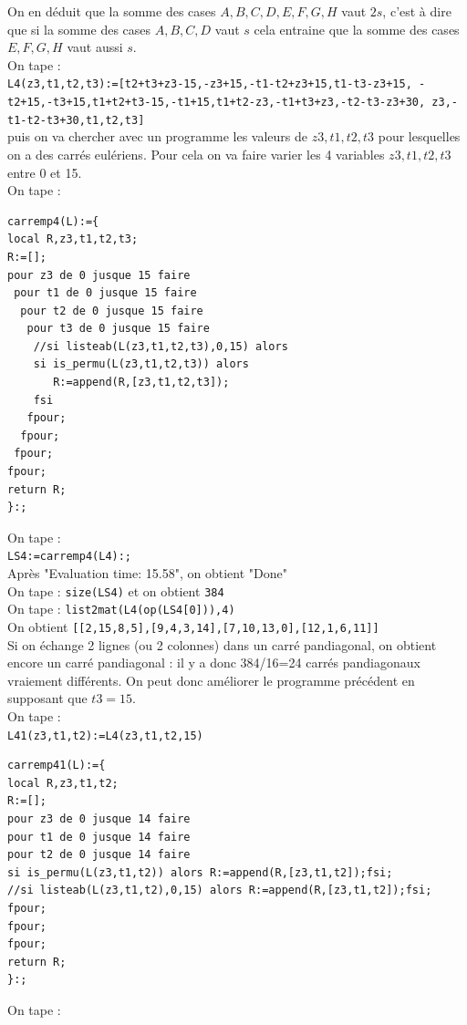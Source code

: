 \documentclass[a4paper,11pt]{book}
\begin{document}
On en d\'eduit que la somme des cases $A,B,C,D,E,F,G,H$ vaut $2s$,
c'est \`a dire que si la somme des cases $A,B,C,D$ vaut $s$ cela entraine que
la somme des cases $E,F,G,H$ vaut aussi $s$.\\
On tape :\\
{\tt L4(z3,t1,t2,t3):=[t2+t3+z3-15,-z3+15,-t1-t2+z3+15,t1-t3-z3+15,
-t2+15,-t3+15,t1+t2+t3-15,-t1+15,t1+t2-z3,-t1+t3+z3,-t2-t3-z3+30,
z3,-t1-t2-t3+30,t1,t2,t3]}\\
puis on va chercher avec un programme les valeurs de $z3,t1,t2,t3$ pour 
lesquelles on a des carr\'es eul\'eriens. Pour cela on va faire varier les 4 
variables $z3,t1,t2,t3$ entre 0 et 15. \\
On tape :
\begin{verbatim}
carremp4(L):={
local R,z3,t1,t2,t3;
R:=[];
pour z3 de 0 jusque 15 faire
 pour t1 de 0 jusque 15 faire
  pour t2 de 0 jusque 15 faire
   pour t3 de 0 jusque 15 faire
    //si listeab(L(z3,t1,t2,t3),0,15) alors
    si is_permu(L(z3,t1,t2,t3)) alors 
       R:=append(R,[z3,t1,t2,t3]);
    fsi
   fpour;
  fpour;
 fpour;
fpour;
return R;
}:;
\end{verbatim}
On tape :\\
{\tt LS4:=carremp4(L4):;}\\
Apr\`es "Evaluation time: 15.58", on obtient "Done"\\
On tape : {\tt size(LS4)} et on obtient {\tt 384}\\
On tape : {\tt list2mat(L4(op(LS4[0])),4)}\\
On obtient {\tt [[2,15,8,5],[9,4,3,14],[7,10,13,0],[12,1,6,11]]}\\
Si on \'echange 2 lignes (ou 2 colonnes) dans un carr\'e pandiagonal, on obtient
 encore un carr\'e pandiagonal : il y a donc 384/16=24 carr\'es pandiagonaux
vraiement diff\'erents. On peut donc am\'eliorer le programme pr\'ec\'edent en 
supposant que $t3=15$.\\
On tape :\\
{\tt L41(z3,t1,t2):=L4(z3,t1,t2,15)}
\begin{verbatim}
carremp41(L):={
local R,z3,t1,t2;
R:=[];
pour z3 de 0 jusque 14 faire
pour t1 de 0 jusque 14 faire
pour t2 de 0 jusque 14 faire
si is_permu(L(z3,t1,t2)) alors R:=append(R,[z3,t1,t2]);fsi;
//si listeab(L(z3,t1,t2),0,15) alors R:=append(R,[z3,t1,t2]);fsi;
fpour;
fpour;
fpour;
return R;
}:;
\end{verbatim}
On tape :\\
\end{document}
